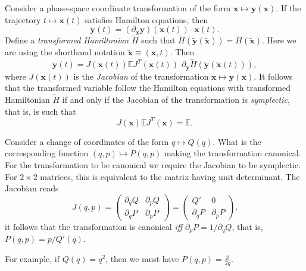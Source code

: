 \documentclass[12pt]{report}
\newcommand{\EE}{\mathbb{E}}
\newcommand{\bs}[1]{\boldsymbol{#1}}
\begin{document}
Consider a phase-space coordinate transformation of the form $\bs x\mapsto \bs y(\bs x)$. If the trajectory $t\mapsto\bs x(t)$ satisfies Hamilton equations, then
\begin{equation}
	\dot{\bs y}(t) =
	(\partial_{\bs x}\bs y)(\bs x(t))
	\cdot \dot{\bs x}(t).
\end{equation}
Define a \emph{transformed Hamiltonian} $\tilde H$ such that
$\tilde H(\tilde{\bs y}(\tilde{\bs x})) = H(\tilde{\bs x})$.
Here we are using the shorthand notation $\tilde{\bs x}\equiv(\bs x,t)$.
Then
\begin{equation}
	\dot{\bs y}(t) = J(\bs x(t)) \EE J^T(\bs x(t))
	\,\, \partial_{\bs y}\tilde H(\tilde{\bs y}(\tilde{\bs x}(t))),
\end{equation}
where $J(\bs x(t))$ is the \emph{Jacobian} of the transformation $\bs x\mapsto \bs y(\bs x)$.
It follows that the transformed variable follow the Hamilton equations with transformed Hamiltonian $\tilde H$ if and only if the Jacobian of the transformation is \emph{symplectic}, that is, is such that
\begin{equation}
	J(\bs x)\EE J^T(\bs x) = \EE.
\end{equation}

\begin{example}
	Consider a change of coordinates of the form $q\mapsto Q(q)$.
	What is the corresponding function $(q,p)\mapsto P(q,p)$ making the transformation canonical.
	For the transformation to be canonical we require the Jacobian to be symplectic. For $2\times2$ matrices, this is equivalent to the matrix having unit determinant. The Jacobian reads
	\begin{equation}
		J(q,p) = \begin{pmatrix}
			\partial_q Q & \partial_p Q \\
			\partial_q P & \partial_p P
		\end{pmatrix} =
		\begin{pmatrix}
			Q' & 0 \\
			\partial_q P & \partial_p P
		\end{pmatrix}.
	\end{equation}
	it follows that the transformation is canonical \emph{iff} $\partial_p P=1/\partial_q Q$, that is, $P(q,p) = p / Q'(q)$.

	For example, if $Q(q)=q^2$, then we must have $P(q,p) = \frac{p}{2q}$.
\end{example}
\end{document}
